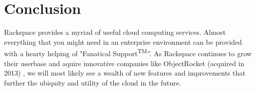 \documentclass[DIV=calc, paper=letter, fontsize=12pt, twocolumn]{scrartcl}	 %
\begin{document}
\section*{Conclusion}

Rackspace provides a myriad of useful cloud computing services. Almost everything
that you might need in an enterprise environment can be provided with a hearty
helping of "Fanatical Support\textsuperscript{TM}''. As Rackspace continues to 
grow their userbase and aquire innovative companies like ObjectRocket (acquired in 2013)
\cite{ref:objectrocket}, we will most likely see a wealth of new features and
improvements that further the ubiquity and utility of the cloud in the future.

\vfill




\pagebreak




 

\end{document}

